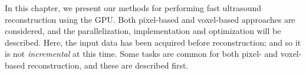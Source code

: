 In this chapter, we present our methods for performing fast ultrasound reconstruction using the GPU. Both pixel-based and voxel-based approaches are considered, and the parallelization, implementation and optimization will be described. Here, the input data has been acquired before reconstruction; and so it is not \emph{incremental} at this time. Some tasks are common for both pixel- and voxel-based reconstruction, and these are described first.
